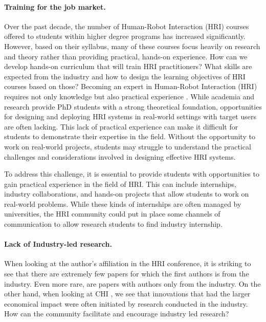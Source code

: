 \documentclass[letterpaper]{article} %
\begin{document}
\paragraph{Training for the job market.} Over the past decade, the number of Human-Robot Interaction (HRI) courses offered to students within higher degree programs has increased significantly. However, based on their syllabus, many of these courses focus heavily on research and theory rather than providing practical, hands-on experience. How can we develop hands-on curriculum that will train HRI practitioners? What skills are expected from the industry and how to design the learning objectives of HRI courses based on those?
Becoming an expert in Human-Robot Interaction (HRI) requires not only knowledge but also practical experience \cite{lynham2002general}. While academia and research provide PhD students with a strong theoretical foundation, opportunities for designing and deploying HRI systems in real-world settings with target users are often lacking.
This lack of practical experience can make it difficult for students to demonstrate their expertise in the field. Without the opportunity to work on real-world projects, students may struggle to understand the practical challenges and considerations involved in designing effective HRI systems.

To address this challenge, it is essential to provide students with opportunities to gain practical experience in the field of HRI. This can include internships, industry collaborations, and hands-on projects that allow students to work on real-world problems.
While these kinds of internships are often managed by universities, the HRI community could put in place some channels of communication to allow research students to find industry internship.

\paragraph{Lack of Industry-led research.} When looking at the author's affiliation in the HRI conference, it is striking to see that there are extremely few papers for which the first authors is from the industry. Even more rare, are papers with authors only from the industry.
On the other hand, when looking at CHI \cite{shneiderman_growth_2017}, we see that innovations that had the larger economical impact were often initiated by research conducted in the industry.
How can the community facilitate and encourage industry led research?
\end{document}
